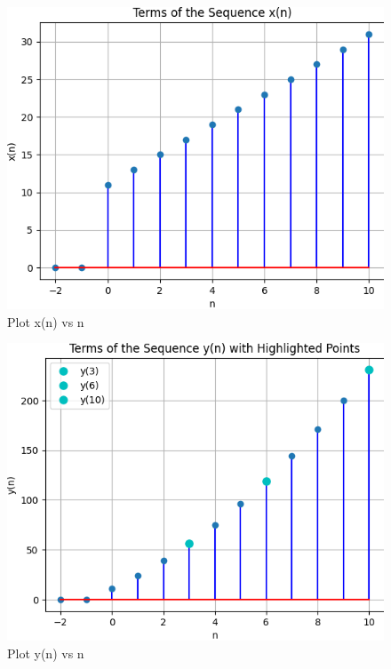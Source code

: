 \documentclass[journal,12pt,twocolumn]{IEEEtran}
\theoremstyle{remark}
\begin{document}
\begin{figure}
    
    \includegraphics[width=\columnwidth]{figs/fig.png}
    \caption{Plot x(n) vs n}
    \label{fig:enter-label}
\end{figure}

\begin{figure}
    
    \includegraphics[width=\columnwidth]{figs/fig2.png}
    \caption{Plot y(n) vs n}
    \label{fig:enter-label}
\end{figure}
\end{document}
